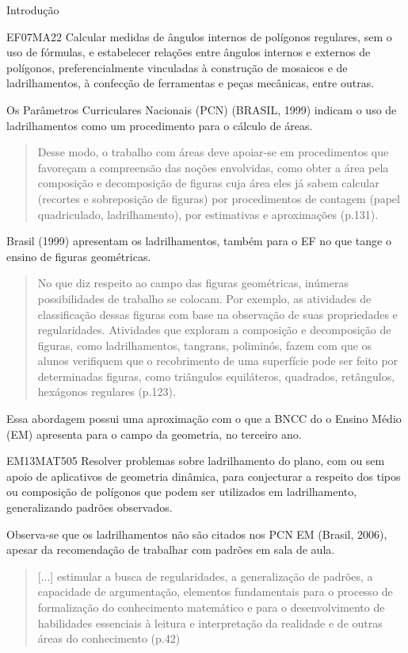 \begin{apresentacao}{Introdução}
\begin{habilities}{EF07MA22} Calcular medidas de ângulos internos de polígonos regulares, sem o uso de fórmulas, e estabelecer relações entre ângulos internos e externos de polígonos, preferencialmente vinculadas à construção de mosaicos e de ladrilhamentos, à confecção de ferramentas e peças mecânicas, entre outras. 
\end{habilities}

Os Parâmetros Curriculares Nacionais (PCN) (BRASIL, 1999) indicam o uso de ladrilhamentos como um procedimento para o cálculo de áreas.
\begin{quote}
Desse modo, o trabalho com áreas deve apoiar-se em procedimentos que favoreçam a compreensão das noções envolvidas, como obter a área pela composição e decomposição de figuras cuja área eles já sabem calcular (recortes e sobreposição de figuras) por procedimentos de contagem (papel quadriculado, ladrilhamento), por estimativas e aproximações (p.131).
\end{quote}

Brasil (1999) apresentam os ladrilhamentos, também para o EF no que tange o ensino de figuras geométricas.
\begin{quote}
No que diz respeito ao campo das figuras geométricas, inúmeras possibilidades de trabalho se colocam. Por exemplo, as atividades de classificação dessas figuras com base na observação de suas propriedades e regularidades. Atividades que exploram a composição e decomposição de figuras, como ladrilhamentos, tangrans, poliminós, fazem com que os alunos verifiquem que o recobrimento de uma superfície pode ser feito por determinadas figuras, como triângulos equiláteros, quadrados, retângulos, hexágonos regulares (p.123).
\end{quote}

Essa abordagem possui uma aproximação com o que a BNCC do o Ensino Médio (EM) apresenta para o campo da geometria, no terceiro ano.


\begin{habilities}{EM13MAT505} 
Resolver problemas sobre ladrilhamento do plano, com ou sem apoio de aplicativos de geometria dinâmica, para conjecturar a respeito dos tipos ou composição de polígonos que podem ser utilizados em ladrilhamento, generalizando padrões observados.
\end{habilities}

Observa-se que os ladrilhamentos não são citados nos PCN EM (Brasil, 2006), apesar da recomendação de trabalhar com padrões em sala de aula. 
\begin{quote}
[...] estimular a busca de regularidades, a generalização de padrões, a capacidade de argumentação, elementos fundamentais para o processo de formalização do conhecimento matemático e para o desenvolvimento de habilidades essenciais à leitura e interpretação da realidade e de outras áreas do conhecimento (p.42)
\end{quote}


\end{apresentacao}
